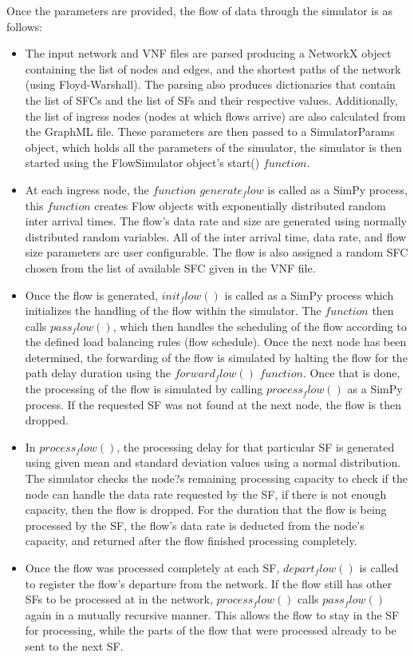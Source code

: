 Once the parameters are provided, the flow of data through the simulator is as follows:
\begin{itemize}
\item The input network and VNF files are parsed producing a NetworkX object containing the list of nodes and edges, and the shortest paths of the network (using Floyd-Warshall). The
parsing also produces dictionaries that contain the list of SFCs and the list of SFs and
their respective values. Additionally, the list of ingress nodes (nodes at which flows
arrive) are also calculated from the GraphML file. These parameters are then passed to a
SimulatorParams object, which holds all the parameters of the simulator, the simulator is then started using the FlowSimulator object's start() $function$.

\item At each ingress node, the $function$ $generate_flow$ is called as a SimPy process, this
$function$ creates Flow objects with exponentially distributed random inter arrival times.
The flow's data rate and size are generated using normally distributed random variables.
All of the inter arrival time, data rate, and flow size parameters are user configurable.
The flow is also assigned a random SFC chosen from the list of available SFC given in the VNF file.

\item Once the flow is generated, $init_flow()$ is called as a SimPy process which initializes
the handling of the flow within the simulator. The $function$ then calls $pass_flow()$, which
then handles the scheduling of the flow according to the defined load balancing rules
(flow schedule). Once the next node has been determined, the forwarding of the flow is
simulated by halting the flow for the path delay duration using the $forward_flow()$
$function$. Once that is done, the processing of the flow is simulated by calling
$process_flow()$ as a SimPy process. If the requested SF was not found at the next
 node, the flow is then dropped.

\item In $process_flow()$, the processing delay for that particular SF is generated using
given
mean and standard deviation values using a normal distribution. The simulator checks the
node?s remaining processing capacity to check if the node can handle the data rate
requested by the SF, if there is not enough capacity, then the flow is dropped. For the
duration that the flow is being processed by the SF, the flow's data rate is deducted from the node's capacity, and returned after the flow finished processing completely.

\item Once the flow was processed completely at each SF, $depart_flow()$ is called to
register the flow's departure from the network. If the flow still has other SFs to be
processed at
in the network, $process_flow()$ calls $pass_flow()$ again in a mutually recursive manner.
This allows the flow to stay in the SF for processing, while the parts of the flow that
were processed already to be sent to the next SF.
\end{itemize}

